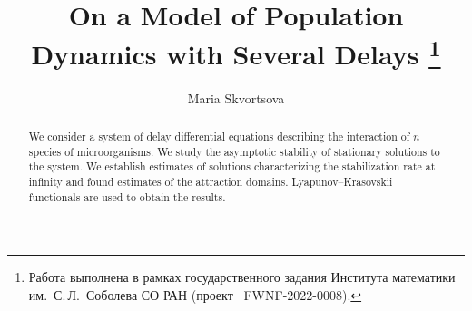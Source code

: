 \begin{englishtitle} %
\title{On a Model of Population Dynamics  
with Several Delays \thanks{Работа выполнена в рамках государственного задания
Института математики им.~С.\,Л.~Соболева СО РАН 
(проект \textnumero~FWNF-2022-0008).
}}
\author{Maria Skvortsova%
}

\maketitle

\begin{abstract}
We consider a system of delay differential equations
describing the interaction of
$n$
species of microorganisms.
We study the asymptotic stability of stationary solutions to the system.
We establish estimates of solutions characterizing the stabilization rate at infinity
and found estimates of the attraction domains.
Lyapunov--Krasovskii functionals are used to obtain the results.

\end{abstract}
\end{englishtitle}

\iffalse

%
%

